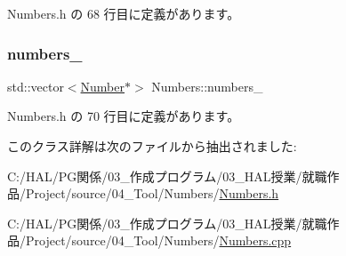  Numbers.\+h の 68 行目に定義があります。

\mbox{\label{class_numbers_ab0649eccc71117670e5dc1ecc4cbe2a2}} 
\subsubsection{\texorpdfstring{numbers\+\_\+}{numbers\_}}
{\footnotesize\ttfamily std\+::vector$<$\mbox{\hyperlink{class_number}{Number}}$\ast$$>$ Numbers\+::numbers\+\_\+\hspace{0.3cm}{\ttfamily [private]}}



 Numbers.\+h の 70 行目に定義があります。



このクラス詳解は次のファイルから抽出されました\+:\begin{DoxyCompactItemize}
\item 
C\+:/\+H\+A\+L/\+P\+G関係/03\+\_\+作成プログラム/03\+\_\+\+H\+A\+L授業/就職作品/\+Project/source/04\+\_\+\+Tool/\+Numbers/\mbox{\hyperlink{_numbers_8h}{Numbers.\+h}}\item 
C\+:/\+H\+A\+L/\+P\+G関係/03\+\_\+作成プログラム/03\+\_\+\+H\+A\+L授業/就職作品/\+Project/source/04\+\_\+\+Tool/\+Numbers/\mbox{\hyperlink{_numbers_8cpp}{Numbers.\+cpp}}\end{DoxyCompactItemize}

